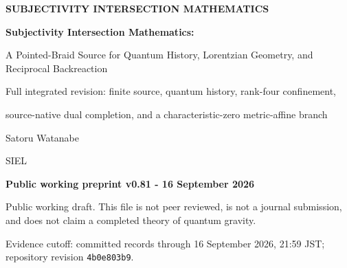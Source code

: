 \documentclass[12pt,a4paper,twoside]{article}
\begin{document}
\pagestyle{plain}

\begin{titlepage}
\centering
\vspace*{14mm}
{\sffamily\small\bfseries\color{blue} SUBJECTIVITY INTERSECTION MATHEMATICS}\par
\vspace{9mm}
{\fontsize{25}{30}\selectfont\bfseries\color{navy}
Subjectivity Intersection Mathematics:\par
A Pointed-Braid Source for Quantum History, Lorentzian Geometry, and Reciprocal Backreaction\par}
\vspace{7mm}
{\Large Full integrated revision: finite source, quantum history, rank-four confinement,\par
source-native dual completion, and a characteristic-zero metric-affine branch\par}
\vspace{18mm}
{\large Satoru Watanabe}\par
{SIEL}\par
\vfill
\begin{tcolorbox}[colback=warm,colframe=navy,boxrule=0.8pt,arc=1mm,width=0.88\textwidth]
\centering
\textbf{Public working preprint v0.81 - 16 September 2026}\par
\small Public working draft. This file is not peer reviewed, is not a journal submission, and does not claim a completed theory of quantum gravity.
\end{tcolorbox}
\vspace{11mm}
{\small Evidence cutoff: committed records through 16 September 2026, 21:59 JST; repository revision \texttt{4b0e803b9}.}
\end{titlepage}
\setcounter{page}{1}
\end{document}

